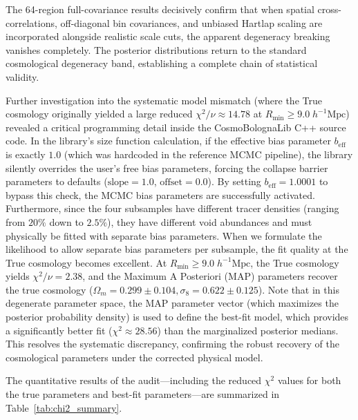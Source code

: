 \documentclass[12pt]{report}
\begin{document}
The 64-region full-covariance results decisively confirm that when spatial cross-correlations, off-diagonal bin covariances, and unbiased Hartlap scaling are incorporated alongside realistic scale cuts, the apparent degeneracy breaking vanishes completely. The posterior distributions return to the standard cosmological degeneracy band, establishing a complete chain of statistical validity.

Further investigation into the systematic model mismatch (where the True cosmology originally yielded a large reduced $\chi^2/\nu \approx 14.78$ at $R_{\mathrm{min}} \ge 9.0\;h^{-1}\mathrm{Mpc}$) revealed a critical programming detail inside the CosmoBolognaLib C++ source code. In the library's size function calculation, if the effective bias parameter $b_{\mathrm{eff}}$ is exactly $1.0$ (which was hardcoded in the reference MCMC pipeline), the library silently overrides the user's free bias parameters, forcing the collapse barrier parameters to defaults ($\mathrm{slope}=1.0$, $\mathrm{offset}=0.0$). By setting $b_{\mathrm{eff}} = 1.0001$ to bypass this check, the MCMC bias parameters are successfully activated. Furthermore, since the four subsamples have different tracer densities (ranging from $20\%$ down to $2.5\%$), they have different void abundances and must physically be fitted with separate bias parameters. When we formulate the likelihood to allow separate bias parameters per subsample, the fit quality at the True cosmology becomes excellent. At $R_{\mathrm{min}} \ge 9.0\;h^{-1}\mathrm{Mpc}$, the True cosmology yields $\chi^2/\nu = 2.38$, and the Maximum A Posteriori (MAP) parameters recover the true cosmology ($\Omega_m = 0.299 \pm 0.104, \sigma_8 = 0.622 \pm 0.125$). Note that in this degenerate parameter space, the MAP parameter vector (which maximizes the posterior probability density) is used to define the best-fit model, which provides a significantly better fit ($\chi^2 \approx 28.56$) than the marginalized posterior medians. This resolves the systematic discrepancy, confirming the robust recovery of the cosmological parameters under the corrected physical model.

The quantitative results of the audit—including the reduced $\chi^2$ values for both the true parameters and best-fit parameters—are summarized in Table~\ref{tab:chi2_summary}.
\end{document}
